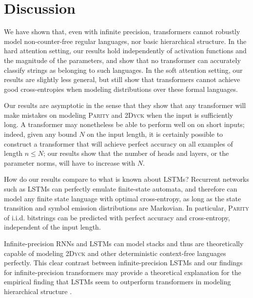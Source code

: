 \documentclass[11pt,a4paper]{article}
\begin{document}




\section{Discussion}\label{sec:discussion}

We have shown that, even with infinite precision, transformers cannot robustly model non-counter-free regular languages, nor basic hierarchical structure.
In the hard attention setting, our results hold independently of activation functions and the magnitude of the parameters, and show that no transformer   can accurately classify strings as belonging to such languages.
In the soft attention setting, our results are slightly less general, but still show that transformers cannot achieve good cross-entropies when modeling distributions over these formal languages.


Our results are asymptotic in the sense that they show that any transformer will make mistakes on modeling \textsc{Parity} and \textsc{2Dyck} when the input is sufficiently long.
A transformer may nonetheless be able to perform well on on short inputs; indeed, given any bound $N$ on the input length, it is certainly possible to construct a transformer that will achieve perfect accuracy on all examples of length $n \leq N$; our results show that the number of heads and layers, or the parameter norms, will have to increase with $N$.


How do our results compare to what is known about LSTMs?
Recurrent networks such as LSTMs can perfectly emulate finite-state automata, and therefore can model any finite state language with optimal cross-entropy, as long as the state transition and symbol emission distributions are Markovian.
In particular, \textsc{Parity} of i.i.d. bitstrings can be predicted with perfect accuracy and cross-entropy, independent of the input length.

Infinite-precision RNNs and LSTMs can model stacks \cite{tabor2000fractal,gruning2006stack,kirov2012processing} and thus are theoretically capable of modeling \textsc{2Dyck} and other deterministic context-free languages perfectly. %
This clear contrast between infinite-precision LSTMs and our findings for infinite-precision transformers may provide a theoretical explanation for the empirical finding that LSTMs seem to outperform transformers in modeling hierarchical structure \citep{tran2018importance}.
\end{document}
